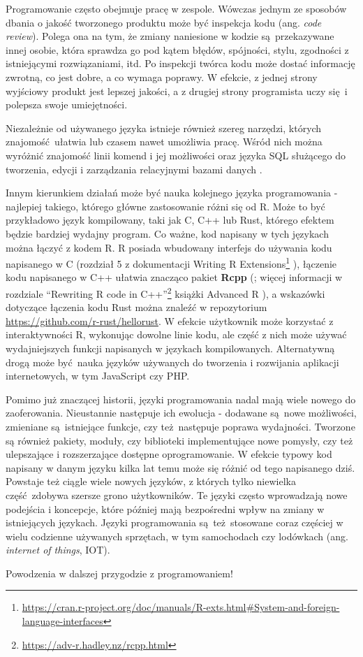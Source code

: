 \documentclass[paper=6in:9in,pagesize=pdftex,headinclude=on,footinclude=on,10pt]{scrbook}
\DeclareRobustCommand{\href}[2]{#2\footnote{\url{#1}}}
\begin{document}
Programowanie często obejmuje pracę w zespole.
Wówczas jednym ze sposobów dbania o jakość tworzonego produktu może być inspekcja kodu (ang. \emph{code review}).
Polega ona na tym, że zmiany naniesione w kodzie są~przekazywane innej osobie, która sprawdza go pod kątem błędów, spójności, stylu, zgodności z istniejącymi rozwiązaniami, itd.
Po inspekcji twórca kodu może dostać informację zwrotną, co jest dobre, a co wymaga poprawy.
W efekcie, z jednej strony wyjściowy produkt jest lepszej jakości, a z drugiej strony programista uczy się~i polepsza swoje umiejętności.

Niezależnie od używanego języka istnieje również szereg narzędzi, których znajomość~ułatwia lub czasem nawet umożliwia pracę.
Wśród nich można wyróżnić znajomość linii komend i jej możliwości \citep{krossUnixWorkbench2017} oraz języka SQL służącego do tworzenia, edycji i zarządzania relacyjnymi bazami danych \citep{beighley2007head, forta2013sams}.

Innym kierunkiem działań może być nauka kolejnego języka programowania - najlepiej takiego, którego główne zastosowanie różni się od R.
Może to być przykładowo język kompilowany, taki jak C, C++ lub Rust, którego efektem będzie bardziej wydajny program.
Co ważne, kod napisany w tych językach można łączyć z kodem R.
R posiada wbudowany interfejs do używania kodu napisanego w C (rozdział 5 z dokumentacji \href{https://cran.r-project.org/doc/manuals/R-exts.html\#System-and-foreign-language-interfaces}{Writing R Extensions} \citep{team1999writing}), łączenie kodu napisanego w C++ ułatwia znacząco pakiet \textbf{Rcpp} (\citet{R-Rcpp}; więcej informacji w rozdziale \href{https://adv-r.hadley.nz/rcpp.html}{``Rewriting R code in C++''} książki Advanced R \citep{wickham2014advanced}), a wskazówki dotyczące łączenia kodu Rust można znaleźć w repozytorium \url{https://github.com/r-rust/hellorust}.
W efekcie użytkownik może korzystać z interaktywności R, wykonując dowolne linie kodu, ale część z nich może używać wydajniejszych funkcji napisanych w językach kompilowanych.
Alternatywną drogą może być~nauka języków używanych do tworzenia i rozwijania aplikacji internetowych, w tym JavaScript czy PHP.

Pomimo już znaczącej historii, języki programowania nadal mają wiele nowego do zaoferowania.
Nieustannie następuje ich ewolucja - dodawane są~nowe możliwości, zmieniane są~istniejące funkcje, czy też~następuje poprawa wydajności.
Tworzone są również pakiety, moduły, czy biblioteki implementujące nowe pomysły, czy też ulepszające i rozszerzające dostępne oprogramowanie.
W efekcie typowy kod napisany w danym języku kilka lat temu może się różnić od tego napisanego dziś.
Powstaje też ciągle wiele nowych języków, z których tylko niewielka część~zdobywa szersze grono użytkowników.
Te języki często wprowadzają nowe podejścia i koncepcje, które później mają bezpośredni wpływ na zmiany w istniejących językach.
Języki programowania są~też~stosowane coraz częściej w wielu codzienne używanych sprzętach, w tym samochodach czy lodówkach (ang. \emph{internet of things}, IOT).

Powodzenia w dalszej przygodzie z programowaniem!


\end{document}
